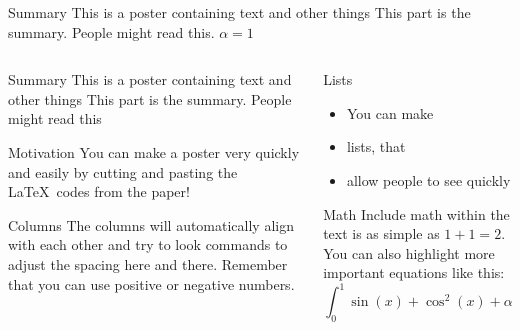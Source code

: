 \begin{frame}{}

      \begin{block}{Summary}
        This is a poster containing text and other things
        This part is the summary.  People might read this. $\alpha = 1$
      \end{block}
% 
  \begin{columns}[t]
% 
    \begin{column}{0.32\linewidth}

      \begin{block}{Summary}
        This is a poster containing text and other things
        This part is the summary.  People might read this
      \end{block}

      \begin{block}{Motivation}
        You can make a poster very quickly and easily by cutting and pasting
        the \LaTeX~codes from the paper!
      \end{block}

      \begin{block}{Columns}
        The columns will automatically align with each other and try to look
        commands to adjust the spacing here and there.  Remember that you can
        use positive or negative numbers.
      \end{block}

    \end{column}%

    \begin{column}{0.32\linewidth}

      \begin{block}{Lists}
        \begin{itemize}
          \item You can make
          \item lists, that
          \item allow people to see quickly
        \end{itemize}
      \end{block}

      \begin{block}{Math}
        Include math within the text is as simple as $1+1=2$.  You can also
        highlight more important equations like this:
        \begin{equation}
          \int_0^1\sin(x)+\cos^2(x)+\alpha x~d\!x
        \end{equation}
      \end{block}


\end{column}
\end{columns}
\end{frame}
